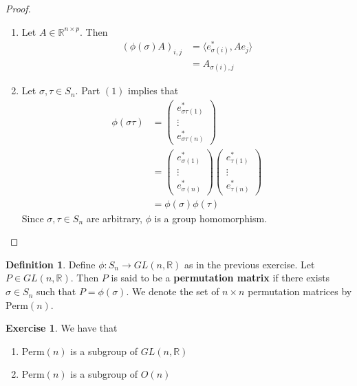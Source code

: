 \documentclass{book}
\theoremstyle{definition}
\newtheorem{defn}[definition]{Definition}
\newtheorem{ex}[definition]{Exercise}
\newcommand{\sig}{\sigma}
\newcommand{\R}{\mathbb{R}}
\DeclareMathOperator*{\0}{\mbf{0}}
\DeclareMathOperator*{\1}{\mbf{1}}
\renewcommand{\r}{\rangle}
\renewcommand{\l}{\langle}
\newcommand{\tbf}[1]{\textbf{#1}}
\newcommand{\Perm}{\text{Perm}}
\begin{document}
	\begin{proof}
		\begin{enumerate}
			\item Let  $A \in \R^{n \times p}$. Then 
			\begin{align*}
				(\phi(\sig) A)_{i,j}
				& = \l e_{\sig(i)}^*, A e_j \r \\
				& = A_{\sig(i), j}
			\end{align*}
			\item Let $\sig, \tau \in S_n$. Part $(1)$ implies that 
			\begin{align*}
				\phi(\sig \tau)
				& = 
				\begin{pmatrix}
					e_{\sig \tau (1)}^* \\
					\vdots \\
					e_{\sig \tau (n)}^*
				\end{pmatrix} \\
				& = \begin{pmatrix}
					e_{\sig (1)}^* \\
					\vdots \\
					e_{\sig (n)}^*
				\end{pmatrix} 
				\begin{pmatrix}
					e_{\tau (1)}^* \\
					\vdots \\
					e_{\tau (n)}^*
				\end{pmatrix} \\
				& = \phi(\sig) \phi(\tau)
			\end{align*}
			Since $\sig, \tau \in S_n$ are arbitrary, $\phi$ is a group homomorphism. 
		\end{enumerate}
	\end{proof}
	
	
	\begin{defn}
		Define $\phi: S_n \rightarrow GL(n, \R)$ as in the previous exercise. Let $P \in GL(n, \R)$. Then $P$ is said to be a \tbf{permutation matrix} if there exists $\sig \in S_n$ such that $P = \phi(\sig)$. We denote the set of $n \times n$ permutation matrices by $\Perm(n)$.
	\end{defn}

	\begin{ex}
		We have that
		\begin{enumerate} 
			\item $\Perm(n)$ is a subgroup of $GL(n, \R)$
			\item $\Perm(n)$ is a subgroup of $O(n)$
		\end{enumerate}
	\end{ex}
\end{document}
